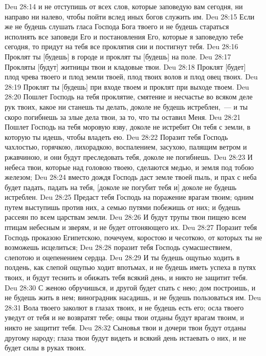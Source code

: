 \vs Deu 28:14 и не отступишь от всех слов, которые заповедую вам сегодня, ни направо ни налево, чтобы пойти вслед иных богов  служить им.
\vs Deu 28:15 Если же не будешь слушать гласа Господа Бога твоего и не будешь стараться исполнять все заповеди Его и постановления Его, которые я заповедую тебе сегодня, то придут на тебя все проклятия сии и постигнут тебя.
\vs Deu 28:16 Проклят ты [будешь] в городе и проклят ты [будешь] на поле.
\vs Deu 28:17 Прокляты [будут] житницы твои и кладовые твои.
\vs Deu 28:18 Проклят [будет] плод чрева твоего и плод земли твоей, плод твоих волов и плод овец твоих.
\vs Deu 28:19 Проклят ты [будешь] при входе твоем и проклят при выходе твоем.
\vs Deu 28:20 Пошлет Господь на тебя проклятие, смятение и несчастье во всяком деле рук твоих, какое ни станешь ты делать, доколе не будешь истреблен,~--- и ты скоро погибнешь за злые дела твои, за то, что ты оставил Меня.
\vs Deu 28:21 Пошлет Господь на тебя моровую язву, доколе не истребит Он тебя с земли, в которую ты идешь, чтобы владеть ею.
\vs Deu 28:22 Поразит тебя Господь чахлостью, горячкою, лихорадкою, воспалением, засухою, палящим ветром и ржавчиною, и они будут преследовать тебя, доколе не погибнешь.
\vs Deu 28:23 И небеса твои, которые над головою твоею, сделаются медью, и земля под тобою железом;
\vs Deu 28:24 вместо дождя Господь даст земле твоей пыль, и прах с неба будет падать, падать на тебя, [доколе не погубит тебя и] доколе не будешь истреблен.
\vs Deu 28:25 Предаст тебя Господь на поражение врагам твоим; одним путем выступишь против них, а семью путями побежишь от них; и будешь рассеян по всем царствам земли.
\vs Deu 28:26 И будут трупы твои пищею всем птицам небесным и зверям, и не будет отгоняющего их.
\vs Deu 28:27 Поразит тебя Господь проказою Египетскою, почечуем, коростою и чесоткою, от которых ты не возможешь исцелиться;
\vs Deu 28:28 поразит тебя Господь сумасшествием, слепотою и оцепенением сердца.
\vs Deu 28:29 И ты будешь ощупью ходить в полдень, как слепой ощупью ходит впотьмах, и не будешь иметь успеха в путях твоих, и будут теснить и обижать тебя всякий день, и никто не защитит тебя.
\vs Deu 28:30 С женою обручишься, и другой будет спать с нею; дом построишь, и не будешь жить в нем; виноградник насадишь, и не будешь пользоваться им.
\vs Deu 28:31 Вола твоего заколют в глазах твоих, и не будешь есть его; осла твоего уведут от тебя и не возвратят тебе; овцы твои отданы будут врагам твоим, и никто не защитит тебя.
\vs Deu 28:32 Сыновья твои и дочери твои будут отданы другому народу; глаза твои будут видеть и всякий день истаевать о них, и не будет силы в руках твоих.
